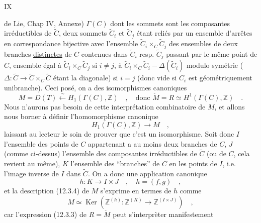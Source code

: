 \hfill IX

de Lie, Chap IV, Annexe) $\Gamma(C)$ dont les sommets sont les composantes irréductibles de $\widetilde C$, deux sommets $\widetilde C_i$ et $\widetilde C_j$ étant reliés par un ensemble d'arrêtes en correspondance bijective avec l'ensemble $\widetilde C_i\times_C\widetilde C_j$ des ensembles de deux branches \uline{distinctes} de $C$ contenues dans $\widetilde C_i$ resp. $\widetilde C_j$ passant par le même point de $C$, ensemble égal à $\widetilde C_i\times_C\widetilde C_j$ si $i\ne j$, à $\widetilde C_i\times_C\widetilde C_i-\Delta(\widetilde C_i)$ modulo symétrie ($\Delta:\widetilde C\longrightarrow\widetilde C\times_C\widetilde C$ étant la diagonale) si $i=j$ (donc vide si $C_i$ est géométriquement unibranche). Ceci posé, on a des isomorphismes canoniques
\[
 M=D(T)\xleftarrow{\sim}H_1(\Gamma(C),\mathbb{Z})\quad,\quad
 \text{donc }\check M=R\simeq H^1(\Gamma(C),\mathbb{Z})\quad .\tag*{(12.3.7)}
\]
Nous n'aurons pas besoin de cette interprétation combinatoire de $M$, et allons nous borner à définir l'homomorphisme canonique
\[
 H_1(\Gamma(C),\mathbb{Z})\longrightarrow M\quad ,
\]
laissant au lecteur le soin de prouver que c'est un isomorphisme. Soit donc $I$ l'ensemble des points de $C$ appartenant a au moins deux branches de $C$, $J$ (comme ci-dessus) l'ensemble des composantes irréductibles de $\widetilde C$ (ou de $C$, cela revient au même), $K$ l'ensemble des ``branches'' de $C$ en les points de $I$, i.e. l'image inverse de $I$ dans $\widetilde C$. On a donc une application canonique
\[
 h:K\longrightarrow I\times J\quad,\quad h=(f,g)\quad ,\tag*{(12.3.9)}
\]
et la description (12.3.4) de $M$ s'exprime en termes de $h$ comme
\[
 M\simeq\operatorname{Ker}(\mathbb{Z}^{(h)}:\mathbb{Z}^{(K)}\longrightarrow\mathbb{Z}^{(I\times J)})\quad ,\tag*{(12.3.10)}
\]
car l'expression (12.3.3) de $R=\check M$ peut s'interprèter manifestement

